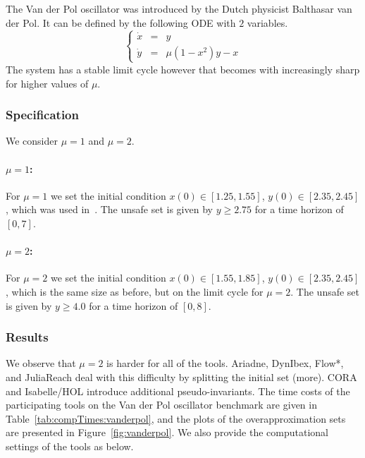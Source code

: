 \documentclass[EPiC]{easychair}
\begin{document}
The Van der Pol oscillator was introduced by the Dutch physicist Balthasar van der Pol. It can be defined by the following ODE with $2$ variables.
\[
 \left\{
 \begin{array}{lcl}
  \dot{x} & = & y \\
  \dot{y} & = & \mu(1 - x^2) y - x
 \end{array}
 \right.
\]
The system has a stable limit cycle however that becomes with increasingly sharp for higher values of $\mu$.

\subsubsection{Specification}
We consider $\mu = 1$ and $\mu = 2$.

\paragraph{$\mu = 1$:} For $\mu = 1$ we set the initial condition $x(0)\in [1.25,1.55]$, $y(0) \in [2.35,2.45]$, which was used in~\cite{Althoff/2010/phd}. The unsafe set is given by $y \geq 2.75$ for a time horizon of $[0, 7]$.

\paragraph{$\mu = 2$:} For $\mu = 2$ we set the initial condition $x(0)\in [1.55,1.85]$, $y(0) \in [2.35,2.45]$, which is the same size as before, but on the limit cycle for $\mu = 2$. The unsafe set is given by $y \geq 4.0$  for a time horizon of $[0, 8]$.


\subsubsection{Results}
We observe that $\mu = 2$ is harder for all of the tools.
Ariadne, DynIbex, Flow*, and JuliaReach deal with this difficulty by splitting the initial set (more). CORA and Isabelle/HOL introduce additional pseudo-invariants.
The time costs of the participating tools on the Van der Pol oscillator benchmark are given in Table~\ref{tab:compTimes:vanderpol}, and the plots of the overapproximation sets are presented in Figure~\ref{fig:vanderpol}. We also provide the computational settings of the tools as below.
\end{document}
